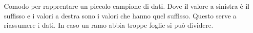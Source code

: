 \documentclass{article}
\begin{document}
  \begin{minipage}[c]{0.30\textwidth}
      \centering
      \vspace{-2mm}
  \end{minipage}
  \hspace{2mm}
  \begin{minipage}[c]{0.6\textwidth}
    Comodo per rapprentare un piccolo campione di dati. Dove il valore a sinistra è il suffisso e i valori a destra sono i valori che hanno quel suffisso. Questo serve a riassumere i dati. In caso un ramo abbia troppe foglie si può dividere.
      \vspace{-3mm}
  \end{minipage}
  \vspace{1mm}
  
\end{document}

